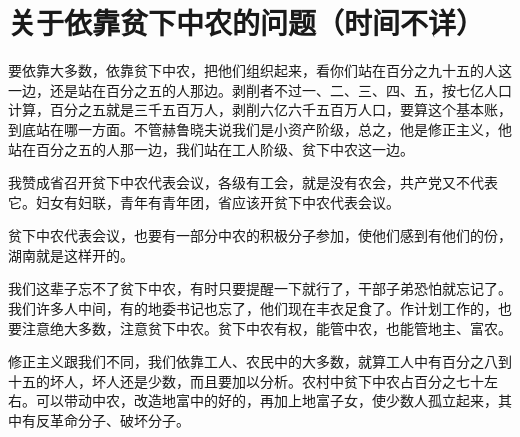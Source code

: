 \section[关于依靠贫下中农的问题（时间不详）]{关于依靠贫下中农的问题（时间不详）}


要依靠大多数，依靠贫下中农，把他们组织起来，看你们站在百分之九十五的人这一边，还是站在百分之五的人那边。剥削者不过一、二、三、四、五，按七亿人口计算，百分之五就是三千五百万人，剥削六亿六千五百万人口，要算这个基本账，到底站在哪一方面。不管赫鲁晓夫说我们是小资产阶级，总之，他是修正主义，他站在百分之五的人那一边，我们站在工人阶级、贫下中农这一边。

我赞成省召开贫下中农代表会议，各级有工会，就是没有农会，共产党又不代表它。妇女有妇联，青年有青年团，省应该开贫下中农代表会议。

贫下中农代表会议，也要有一部分中农的积极分子参加，使他们感到有他们的份，湖南就是这样开的。

我们这辈子忘不了贫下中农，有时只要提醒一下就行了，干部子弟恐怕就忘记了。我们许多人中间，有的地委书记也忘了，他们现在丰衣足食了。作计划工作的，也要注意绝大多数，注意贫下中农。贫下中农有权，能管中农，也能管地主、富农。

修正主义跟我们不同，我们依靠工人、农民中的大多数，就算工人中有百分之八到十五的坏人，坏人还是少数，而且要加以分析。农村中贫下中农占百分之七十左右。可以带动中农，改造地富中的好的，再加上地富子女，使少数人孤立起来，其中有反革命分子、破坏分子。



